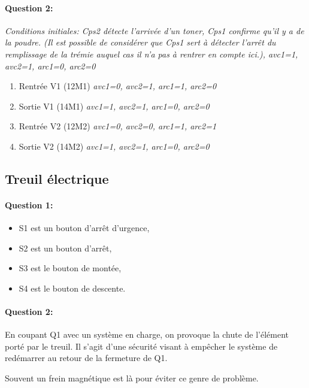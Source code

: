 \paragraph{Question 2:}

\textit{Conditions initiales: Cps2 détecte l'arrivée d'un toner, Cps1 confirme qu'il y a de la poudre. (Il est possible de considérer que Cps1 sert à détecter l'arrêt du remplissage de la trémie auquel cas il n'a pas à rentrer en compte ici.), avc1=1, avc2=1, arc1=0, arc2=0}

\begin{enumerate}
 \item Rentrée V1 (12M1) \textit{avc1=0, avc2=1, arc1=1, arc2=0}
 \item Sortie V1 (14M1) \textit{avc1=1, avc2=1, arc1=0, arc2=0}
 \item Rentrée V2 (12M2) \textit{avc1=0, avc2=0, arc1=1, arc2=1}
 \item Sortie V2 (14M2) \textit{avc1=1, avc2=1, arc1=0, arc2=0} 
\end{enumerate}

\newpage

\subsection{Treuil électrique}

\paragraph{Question 1:}

\begin{itemize}
 \item S1 est un bouton d'arrêt d'urgence,
 \item S2 est un bouton d'arrêt,
 \item S3 est le bouton de montée,
 \item S4 est le bouton de descente.
\end{itemize}

\paragraph{Question 2:} En coupant Q1 avec un système en charge, on provoque la chute de l'élément porté par le treuil. Il s'agit d'une sécurité visant à empêcher le système de redémarrer au retour de la fermeture de Q1.

Souvent un frein magnétique est là pour éviter ce genre de problème.

